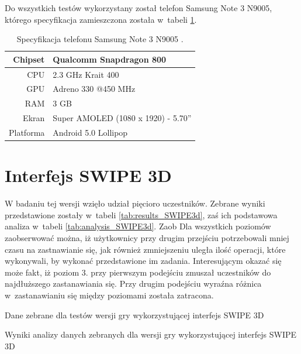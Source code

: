 \documentclass[a4paper,12pt,numbers=noenddot]{report}
\begin{document}
Do wszystkich testów wykorzystany został telefon Samsung Note 3 N9005, którego specyfikacja zamieszczona została w~tabeli \ref{tab:tab_telSpec}.

\begin{table}[H]
  \centering
  \caption{Specyfikacja telefonu Samsung Note 3 N9005 \cite{online_Note3Spec}.}
  \label{tab:tab_telSpec}
  \begin{tabular}{|r|l|}
    \hline
    Chipset & Qualcomm Snapdragon 800 \\
    \hline
    CPU & 2.3 GHz Krait 400\\
    \hline
    GPU & Adreno 330 @450 MHz\\
    \hline
    RAM & 3 GB\\
    \hline
    Ekran & Super AMOLED (1080 x 1920) - 5.70''\\
    \hline
    Platforma & Android 5.0 Lollipop\\
    \hline
  \end{tabular}
\end{table}


\section{Interfejs SWIPE 3D}%
W badaniu tej wersji wzięło udział pięcioro uczestników. Zebrane wyniki przedstawione zostały w~tabeli \ref{tab:results_SWIPE3d}, zaś ich podstawowa analiza w~tabeli \ref{tab:analysis_SWIPE3d}. Zaob
Dla wszystkich poziomów zaobserwować można, iż użytkownicy przy drugim przejściu potrzebowali mniej czasu na zastnawianie się, jak również zmniejszeniu uległa ilość operacji, które wykonywali, by wykonać przedstawione im zadania. 
Interesującym okazać się może fakt, iż poziom 3. przy pierwszym podejściu zmuszał uczestników do najdłuższego zastanawiania się. Przy drugim podejściu wyraźna różnica w~zastanawianiu się między poziomami została zatracona.

\begin{table}

  \caption{Dane zebrane dla testów wersji gry wykorzystującej interfejs SWIPE 3D}
  \resizebox{\textwidth}{!}{%
	
  \end{tabular}%
  }
  \label{tab:results_SWIPE3d}%
  \caption{Wyniki analizy danych zebranych dla wersji gry wykorzystującej interfejs SWIPE 3D}
  \resizebox{\textwidth}{!}{%
	
  \end{tabular}%
  }
  \label{tab:analysis_SWIPE3d}%
\end{table}%
\end{document}
